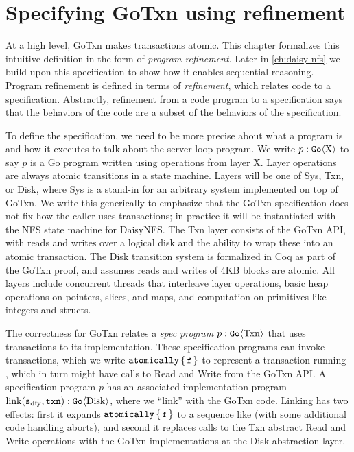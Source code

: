 \section{Specifying GoTxn using refinement}%
\label{sec:gotxn:spec}

At a high level, GoTxn makes transactions atomic. This chapter formalizes this
intuitive definition in the form of \emph{program refinement}. Later in
\cref{ch:daisy-nfs} we build upon this specification to show how it enables
sequential reasoning. Program refinement is defined in terms of
\emph{refinement}, which relates code to a specification. Abstractly, refinement
from a code program to a specification says that the behaviors of the code are a
subset of the behaviors of the specification.

To define the specification, we need to be more precise about what a program is
and how it executes to talk about the server loop program. We
write $p : \mathtt{Go}\langle \mathrm{X} \rangle$ to say $p$ is a Go program written using operations
from layer X.
Layer operations are always atomic transitions in a state machine. Layers will
be one of Sys, Txn, or Disk, where Sys is a
stand-in for an arbitrary system implemented on top of GoTxn. We write this
generically to emphasize that the GoTxn specification does not fix how the
caller uses transactions; in practice it will be instantiated with the NFS state
machine for DaisyNFS.
The Txn layer consists of the GoTxn API, with reads and writes over a logical
disk and the ability to wrap these into an atomic transaction. The
Disk transition system is formalized in Coq as part of the GoTxn proof,
and assumes reads and writes of 4KB blocks are atomic. All layers
include concurrent threads that interleave layer
operations, basic heap operations on pointers, slices, and maps, and computation
on primitives like integers and structs.

The correctness for GoTxn relates a \emph{spec program} $p : \mathtt{Go}\langle \mathrm{Txn} \rangle$
that uses transactions to its implementation. These specification programs can
invoke transactions, which we write $\atomically{\cc{f}}$ to represent a
transaction running , which in turn might have calls to Read and Write
from the GoTxn API. A specification program $p$ has an associated implementation
program $\mathrm{link}(\texttt{s}_{\mathrm{dfy}}, \texttt{txn}) : \mathtt{Go}\langle \mathrm{Disk} \rangle$, where we ``link''
with the GoTxn code. Linking has two effects: first it expands
$\atomically{\cc{f}}$ to a
sequence like  (with some additional code
handling aborts), and second it replaces calls to the Txn abstract Read and
Write operations with the GoTxn implementations at the Disk abstraction layer.

